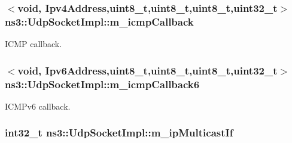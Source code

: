 \subsubsection[{\texorpdfstring{m\+\_\+icmp\+Callback}{m_icmpCallback}}]{$<$void, {\bf Ipv4\+Address},uint8\+\_\+t,uint8\+\_\+t,uint8\+\_\+t,uint32\+\_\+t$>$ ns3\+::\+Udp\+Socket\+Impl\+::m\+\_\+icmp\+Callback\hspace{0.3cm}{\ttfamily [private]}}\hypertarget{classns3_1_1UdpSocketImpl_a0a595e39113e8854c86c820623ae6cd4}{}\label{classns3_1_1UdpSocketImpl_a0a595e39113e8854c86c820623ae6cd4}


I\+C\+MP callback. 

\subsubsection[{\texorpdfstring{m\+\_\+icmp\+Callback6}{m_icmpCallback6}}]{$<$void, {\bf Ipv6\+Address},uint8\+\_\+t,uint8\+\_\+t,uint8\+\_\+t,uint32\+\_\+t$>$ ns3\+::\+Udp\+Socket\+Impl\+::m\+\_\+icmp\+Callback6\hspace{0.3cm}{\ttfamily [private]}}\hypertarget{classns3_1_1UdpSocketImpl_aa4fbff077aa5ca080279196abaa87a04}{}\label{classns3_1_1UdpSocketImpl_aa4fbff077aa5ca080279196abaa87a04}


I\+C\+M\+Pv6 callback. 

\subsubsection[{\texorpdfstring{m\+\_\+ip\+Multicast\+If}{m_ipMulticastIf}}]{\setlength{\rightskip}{0pt plus 5cm}int32\+\_\+t ns3\+::\+Udp\+Socket\+Impl\+::m\+\_\+ip\+Multicast\+If\hspace{0.3cm}{\ttfamily [private]}}\hypertarget{classns3_1_1UdpSocketImpl_a4ff1b1c6db56fad154afe2563d985e08}{}\label{classns3_1_1UdpSocketImpl_a4ff1b1c6db56fad154afe2563d985e08}


